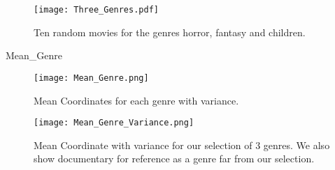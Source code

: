 \begin{figure}[hptb]
\centering
\texttt{[image: Three\_Genres.pdf]}
 \caption{Ten random movies for the genres horror, fantasy and children. }
\label{fig:tg}
\end{figure}
Mean_Genre

\begin{figure}[hptb]
\centering
\texttt{[image: Mean\_Genre.png]}
 \caption{Mean Coordinates for each genre with variance.}
\label{fig:tgMeanGenre}
\end{figure}

\begin{figure}[hptb]
\centering
\texttt{[image: Mean\_Genre\_Variance.png]}
 \caption{Mean Coordinate with variance for our selection of 3 genres. We also show documentary for reference as a genre far from our selection.}
\label{fig:tgMV}
\end{figure}
